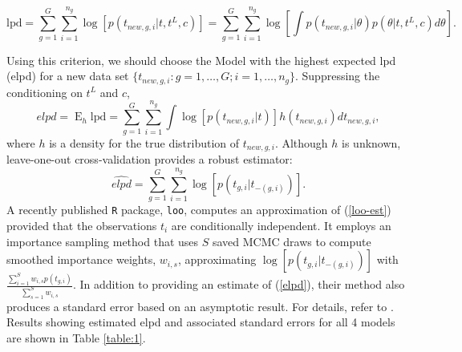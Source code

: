 \documentclass[12pt]{article}
\newcommand{\op}{\operatorname}
\begin{document}
\begin{equation}
\mbox{lpd} = \sum_{g=1}^G \sum_{i=1}^{n_g} \log[p(t_{new,g,i}|t, t^L, c)] = \sum_{g=1}^G \sum_{i=1}^{n_g} \log \left[ \int p(t_{new,g, i}|\theta) p(\theta|t,t^L,c) d\theta \right].
\end{equation}

Using this criterion, we should choose the Model with the highest expected lpd (elpd) for a new data set $\{t_{new,g,i}:g=1,\ldots,G; i=1,\ldots,n_g\}$. Suppressing the conditioning on $t^L$ and $c$,
\begin{equation}
elpd = \op{E}_h \mbox{lpd} = \sum_{g=1}^G \sum_{i=1}^{n_g} \int \log [p(t_{new, g, i}|t)] h(t_{new,g,i}) d t_{new,g,i},
\label{elpd}
\end{equation}
where $h$ is a density for the true distribution of $t_{new,g,i}$. Although $h$ is unknown, leave-one-out cross-validation provides a robust estimator:
\begin{equation}
\widehat{elpd} = \sum_{g=1}^G \sum_{i=1}^{n_g} \log [p(t_{g,i}|t_{-(g,i)})].
\label{loo-est}
\end{equation}
A recently published \texttt{R} package, \texttt{loo}\cite{loo}, computes an approximation of (\ref{loo-est}) provided that the observations $t_i$ are conditionally independent. It employs an importance sampling method that uses $S$ saved MCMC draws to compute smoothed importance weights, $w_{i,s}$, approximating $\log [p(t_{g,i}|t_{-(g,i)})]$ with $\frac{\sum_{i=1}^S w_{i,s} p(t_{g,i})}{\sum_{s=1}^S w_{i,s}}$. In addition to providing an estimate of (\ref{elpd}), their method also produces a standard error based on an asymptotic result. For details, refer to \citet{vehtari}.
Results showing estimated elpd and associated standard errors for all 4 models are shown in Table \ref{table:1}.
\end{document}
